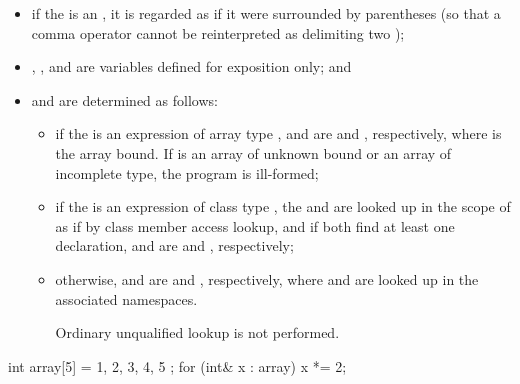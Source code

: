 \begin{itemize}
\item
if the  is an ,
it is regarded as if it were surrounded by parentheses (so that a comma operator
cannot be reinterpreted as delimiting two );

\item {}, , and  are variables defined for
exposition only; and

\item
{} and  are determined as follows:

\begin{itemize}
\item if the  is an expression of
array type ,  and  are
 and  \tcode{+} , respectively,
where  is
the array bound. If  is an array of unknown bound or an array of
incomplete type, the program is ill-formed;

\item if the  is an expression of
class type , the 
 and  are looked up in the scope of 
as if by class member access lookup, and if
both find at least one declaration,  and
 are  and ,
respectively;

\item otherwise,  and  are
 and , respectively,
where  and  are looked
up in the associated namespaces.
\begin{note} Ordinary unqualified lookup is not
performed. \end{note}
\end{itemize}
\end{itemize}

\begin{example}
\begin{codeblock}
int array[5] = { 1, 2, 3, 4, 5 };
for (int& x : array)
  x *= 2;
\end{codeblock}
\end{example}

